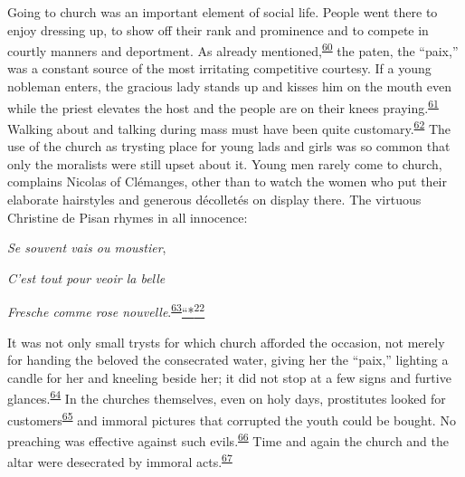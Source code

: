 Going to church was an important element of social life. People went
there to enjoy dressing up, to show off their rank and prominence and to
compete in courtly manners and deportment. As already
mentioned,\textsuperscript{\protect\hypertarget{13_Chapter_Six__THE_DEPICTION_OF_TH.xhtmlux5cux23id_1151}{\protect\hyperlink{23_NOTES.xhtmlux5cux23id_1152}{60}}}
the paten, the ``paix,'' was a constant source of the most irritating
competitive courtesy. If a young nobleman enters, the gracious lady
stands up and kisses him on the mouth even while the priest elevates the
host and the people are on their knees
praying.\textsuperscript{\protect\hypertarget{13_Chapter_Six__THE_DEPICTION_OF_TH.xhtmlux5cux23id_1149}{\protect\hyperlink{23_NOTES.xhtmlux5cux23id_1150}{61}}}
Walking about and talking during mass must have been quite
customary.\textsuperscript{\protect\hypertarget{13_Chapter_Six__THE_DEPICTION_OF_TH.xhtmlux5cux23id_1147}{\protect\hyperlink{23_NOTES.xhtmlux5cux23id_1148}{62}}}
The use of the church as trysting place for young lads and girls was so
common that only the moralists were still upset about it. Young men
rarely come to church, complains
Nico\protect\hypertarget{13_Chapter_Six__THE_DEPICTION_OF_TH.xhtmlux5cux23page_185}{}{}las
of Clémanges, other than to watch the women who put their elaborate
hairstyles and generous décolletés on display there. The virtuous
Christine de Pisan rhymes in all innocence:

\emph{Se souvent vais ou moustier},

\emph{C'est tout pour veoir la belle}

\emph{Fresche comme rose
nouvelle}.\textsuperscript{\protect\hypertarget{13_Chapter_Six__THE_DEPICTION_OF_TH.xhtmlux5cux23id_1145}{\protect\hyperlink{23_NOTES.xhtmlux5cux23id_1146}{63}}}\protect\hypertarget{13_Chapter_Six__THE_DEPICTION_OF_TH.xhtmlux5cux23id_3031}{\protect\hyperlink{23_NOTES.xhtmlux5cux23id_3032}{``*\textsuperscript{22}}}

It was not only small trysts for which church afforded the occasion, not
merely for handing the beloved the consecrated water, giving her the
``paix,'' lighting a candle for her and kneeling beside her; it did not
stop at a few signs and furtive
glances.\textsuperscript{\protect\hypertarget{13_Chapter_Six__THE_DEPICTION_OF_TH.xhtmlux5cux23id_1143}{\protect\hyperlink{23_NOTES.xhtmlux5cux23id_1144}{64}}}
In the churches themselves, even on holy days, prostitutes looked for
customers\textsuperscript{\protect\hypertarget{13_Chapter_Six__THE_DEPICTION_OF_TH.xhtmlux5cux23id_1141}{\protect\hyperlink{23_NOTES.xhtmlux5cux23id_1142}{65}}}
and immoral pictures that corrupted the youth could be bought. No
preaching was effective against such
evils.\textsuperscript{\protect\hypertarget{13_Chapter_Six__THE_DEPICTION_OF_TH.xhtmlux5cux23id_1139}{\protect\hyperlink{23_NOTES.xhtmlux5cux23id_1140}{66}}}
Time and again the church and the altar were desecrated by immoral
acts.\textsuperscript{\protect\hypertarget{13_Chapter_Six__THE_DEPICTION_OF_TH.xhtmlux5cux23id_1137}{\protect\hyperlink{23_NOTES.xhtmlux5cux23id_1138}{67}}}

